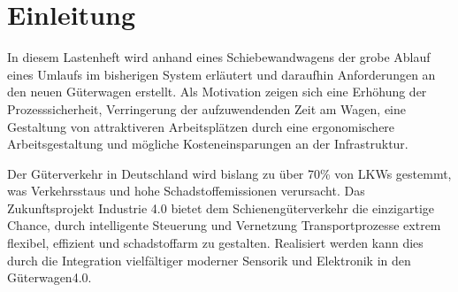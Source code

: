 \section{Einleitung}
In diesem Lastenheft wird anhand eines Schiebewandwagens der grobe Ablauf eines Umlaufs im bisherigen System erläutert und daraufhin Anforderungen an den neuen Güterwagen erstellt. Als Motivation zeigen sich %
eine Erhöhung der Prozesssicherheit, Verringerung der aufzuwendenden Zeit am Wagen, eine Gestaltung von attraktiveren Arbeitsplätzen durch eine ergonomischere Arbeitsgestaltung und mögliche Kosteneinsparungen an der Infrastruktur.\par
Der Güterverkehr in Deutschland wird bislang zu über 70\% von LKWs gestemmt, was Verkehrsstaus und hohe Schadstoffemissionen verursacht. Das Zukunftsprojekt Industrie 4.0 bietet dem Schienengüterverkehr die einzigartige Chance, durch intelligente Steuerung und Vernetzung Transportprozesse extrem flexibel, effizient und schadstoffarm zu gestalten. Realisiert werden kann dies durch die Integration vielfältiger moderner Sensorik und Elektronik in den Güterwagen4.0.\cite{AZAP}\par
